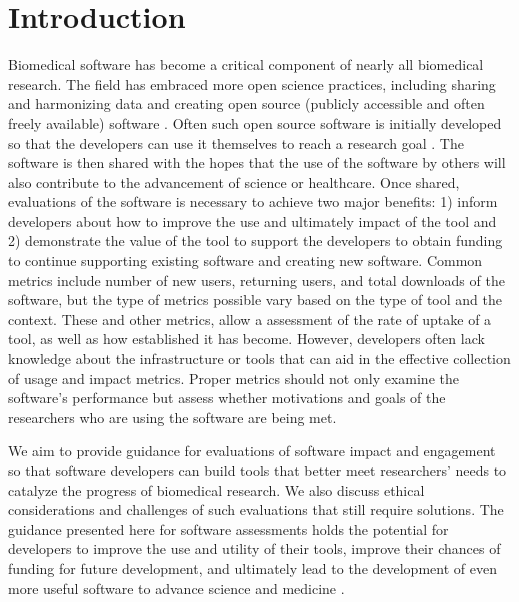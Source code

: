 \documentclass{article}
\begin{document}


\section{Introduction} Biomedical software has become a critical component of nearly all biomedical research. The field has embraced more open science practices, including sharing and harmonizing data and creating open source (publicly accessible and often freely available) software \cite{green_strategic_2020, levet_developing_2021, itcr_open-source_2021, merow_better_2023}. Often such open source software is initially developed so that the developers can use it themselves to reach a research goal \cite{bitzer_intrinsic_2007}. The software is then shared with the hopes that the use of the software by others will also contribute to the advancement of science or healthcare. Once shared, evaluations of the software is necessary to achieve two major benefits: 1) inform developers about how to improve the use and ultimately impact of the tool and 2) demonstrate the value of the tool to support the developers to obtain funding to continue supporting existing software and creating new software. Common metrics include number of new users, returning users, and total downloads of the software, but the type of metrics possible vary based on the type of tool and the context. These and other metrics, allow a assessment of the rate of uptake of a tool, as well as how established it has become. However, developers often lack knowledge about the infrastructure or tools that can aid in the effective collection of usage and impact metrics. Proper metrics should not only examine the software's performance but assess whether motivations and goals of the researchers who are using the software are being met.

We aim to provide guidance for evaluations of software impact and engagement so that software developers can build tools that better meet researchers' needs to catalyze the progress of biomedical research. We also discuss ethical considerations and challenges of such evaluations that still require solutions. The guidance presented here for software assessments holds the potential for developers to improve the use and utility of their tools, improve their chances of funding for future development, and ultimately lead to the development of even more useful software to advance science and medicine \cite{wratten_reproducible_2021}. 
\end{document}
